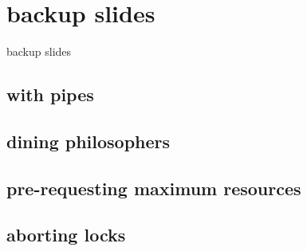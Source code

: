 

\section{backup slides}
\begin{frame}{}
\end{frame}
\begin{frame}{backup slides}
\end{frame}

\subsection{with pipes}


\subsection{dining philosophers}

\subsection{pre-requesting maximum resources}



\subsection{aborting locks}





